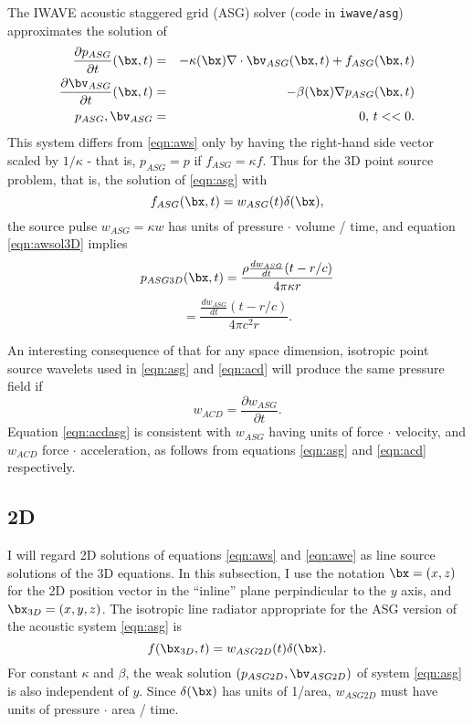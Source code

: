 The IWAVE acoustic staggered grid (ASG) solver (code in {\tt iwave/asg}) approximates the solution of
\begin{eqnarray}
\label{eqn:asg}
\frac{\partial p_{ASG}}{\partial t}(\bx,t) & = &-\kappa(\bx) \nabla \cdot \bv_{ASG}(\bx,t) + f_{ASG}(\bx,t)\nonumber\\
\frac{\partial \bv_{ASG}}{\partial t}(\bx,t) & = & -\beta(\bx) \nabla p_{ASG}(\bx,t)\nonumber\\
p_{ASG}, \bv_{ASG} &=& 0,\, t << 0.
\end{eqnarray}
This system differs from \ref{eqn:aws} only by having the right-hand side vector scaled by $1/\kappa$ - that is, $p_{ASG} = p$ if $f_{ASG} = \kappa f$. Thus for the 3D point source problem, that is, the solution of \ref{eqn:asg} with 
\[
f_{ASG}(\bx,t) = w_{ASG}(t) \delta(\bx),
\]
the source pulse $w_{ASG}=\kappa w$ has units of pressure $\cdot$ volume / time, and equation \ref{eqn:awsol3D} implies
\[
p_{ASG3D}(\bx,t) = \frac{\rho\frac{dw_{ASG}}{dt}(t-r/c)}{4\pi \kappa r}
\]
\begin{equation}
\label{eqn:asgsol3d}
= \frac{\frac{dw_{ASG}}{dt}(t-r/c)}{4\pi c^2 r}.
\end{equation}

An interesting consequence of that for any space dimension, isotropic point source wavelets used in \ref{eqn:asg} and \ref{eqn:acd} will produce the same pressure field if 
\begin{equation}
\label{eqn:acdasg}
w_{ACD} = \frac{\partial w_{ASG}}{\partial t}.
\end{equation}
Equation \ref{eqn:acdasg} is consistent with $w_{ASG}$ having units of force $\cdot$ velocity, and $w_{ACD}$ force $\cdot$ acceleration, as follows from equations \ref{eqn:asg} and \ref{eqn:acd} respectively.

\subsection{2D}
I will regard 2D solutions of equations \ref{eqn:aws} and \ref{eqn:awe} as line source solutions of the 3D equations. In this subsection, I use the notation $\bx=(x,z)$ for the 2D position vector in the ``inline'' plane perpindicular to the $y$ axis, and $\bx_{3D} = (x,y,z)$. The isotropic line radiator appropriate for the ASG version of the acoustic system \ref{eqn:asg} is 
\begin{equation}
\label{eqn:ilr}
f(\bx_{3D},t) = w_{ASG2D}(t)\delta(\bx).
\end{equation}
For constant $\kappa$ and $\beta$, the weak solution $(p_{ASG2D}, \bv_{ASG2D})$ of system \ref{eqn:asg} is also independent of $y$. Since $\delta(\bx)$ has units of 1/area, $w_{ASG2D}$ must have units of pressure $\cdot$ area / time. 
 
